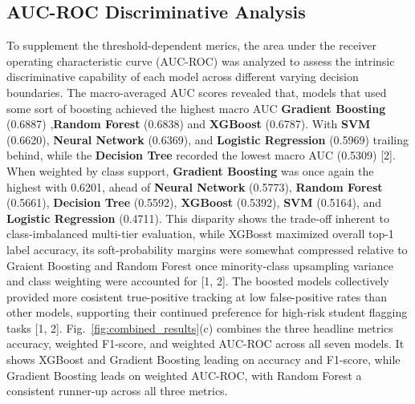 \documentclass[conference]{IEEEtran}
\begin{document}
\subsection{AUC-ROC Discriminative Analysis}
To supplement the threshold-dependent merics, the area under the receiver operating characteristic curve (AUC-ROC) was analyzed to assess the intrinsic discriminative capability of each model across different varying decision boundaries. The macro-averaged AUC scores revealed that, models that used some sort of boosting achieved the highest macro AUC \textbf{Gradient Boosting} (0.6887)
,\textbf{Random Forest} (0.6838) and \textbf{XGBoost} (0.6787). With \textbf{SVM} (0.6620), \textbf{Neural Network} (0.6369), and \textbf{Logistic Regression} (0.5969) trailing behind, while the \textbf{Decision Tree} recorded the lowest macro AUC (0.5309) [2]. When weighted by class support, \textbf{Gradient Boosting} was once again the highest with 0.6201, ahead of \textbf{Neural Network} (0.5773), \textbf{Random Forest} (0.5661), \textbf{Decision Tree} (0.5592), \textbf{XGBoost} (0.5392), \textbf{SVM} (0.5164), and \textbf{Logistic Regression} (0.4711). This disparity shows the trade-off inherent to class-imbalanced multi-tier evaluation, while XGBosst maximized overall top-1 label accuracy, its soft-probability margins were somewhat compressed relative to Graient Boosting and Random Forest once minority-class upsampling variance and class weighting were accounted for [1, 2]. The boosted models collectively provided more cosistent true-positive tracking at low false-positive rates than other models,  supporting their continued preference for high-risk student flagging tasks [1, 2]. Fig.~\ref{fig:combined_results}(c) combines the three headline metrics accuracy, weighted F1-score, and weighted AUC-ROC across all seven models. It shows XGBoost and Gradient Boosting leading on accuracy and F1-score, while Gradient Boosting leads on weighted AUC-ROC, with Random Forest a consistent runner-up across all three metrics.
\end{document}

